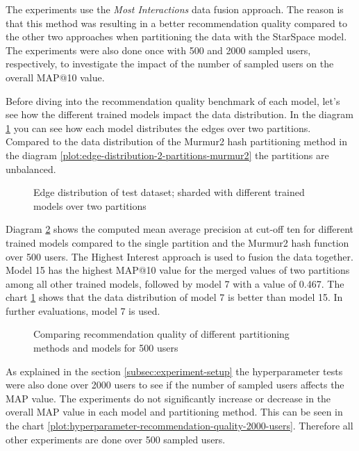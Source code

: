 The experiments use the \emph{Most Interactions} data fusion approach. The reason is that this method was resulting in a better recommendation quality compared to the other two approaches when partitioning the data with the StarSpace model. The experiments were also done once with 500 and 2000 sampled users, respectively, to investigate the impact of the number of sampled users on the overall MAP@10 value.

Before diving into the recommendation quality benchmark of each model, let's see how the different trained models impact the data distribution. In the diagram \ref{plot:edge-distribution} you can see how each model distributes the edges over two partitions. Compared to the data distribution of the Murmur2 hash partitioning method in the diagram \ref{plot:edge-distribution-2-partitions-murmur2} the partitions are unbalanced.


\begin{figure}[h!]
    \centering
    
    \caption{Edge distribution of test dataset; sharded with different trained models over two partitions}
    \label{plot:edge-distribution}
\end{figure}


Diagram \ref{plot:hyperparameter-recommendation-quality} shows the computed mean average precision at cut-off ten for different trained models compared to the single partition and the Murmur2 hash function over 500 users. The Highest Interest approach is used to fusion the data together. Model 15 has the highest MAP@10 value for the merged values of two partitions among all other trained models, followed by model 7 with a value of 0.467. The chart \ref{plot:edge-distribution} shows that the data distribution of model 7 is better than model 15. In further evaluations, model 7 is used.

\begin{figure}[h!]
    \centering
    
    \caption{Comparing recommendation quality of different partitioning methods and models for 500 users}
    \label{plot:hyperparameter-recommendation-quality}
\end{figure}


As explained in the section \ref{subsec:experiment-setup} the hyperparameter tests were also done over 2000 users to see if the number of sampled users affects the MAP value. The experiments do not significantly increase or decrease in the overall MAP value in each model and partitioning method. This can be seen in the chart \ref{plot:hyperparameter-recommendation-quality-2000-users}. Therefore all other experiments are done over 500 sampled users.


